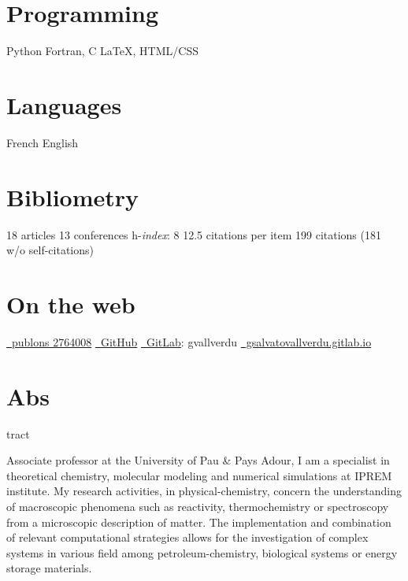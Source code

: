 \documentclass{cv-style}     %
\begin{document}
\begin{aside}
    \section{Programming}
    {\color{gray}\faPython} Python
    Fortran, C
    \LaTeX{}, HTML/CSS
    \section{Languages}
    French
    English 
    \section{Bibliometry}
    18 articles
    13 conferences
    h-\textit{index}: 8
    12.5 citations per item
    199 citations (181 w/o self-citations)
    \section{On the web}
    \href{https://publons.com/researcher/2764008/}{\color{gray}\faNewspaper\small ~publons 2764008}
    \href{https://github.com/gVallverdu}{\color{gray}\faGithub\small ~GitHub} \href{https://gitlab.com/gvallverdu}{\color{gray}\faGitlab\small ~GitLab}: {\small gvallverdu} 
    \href{https://gsalvatovallverdu.gitlab.io/}{\color{gray}\faFile*[regular]\small ~gsalvatovallverdu.gitlab.io}
\end{aside}

\vspace{0mm}
\section{Abs}{tract}
\vspace{-0.2cm}


Associate professor at the University of Pau \& Pays Adour, I am a specialist in
theoretical chemistry, molecular modeling and numerical simulations at IPREM institute.
My research activities, in physical-chemistry, concern the understanding 
of macroscopic phenomena such as reactivity, thermochemistry or spectroscopy from
a microscopic description of matter. The implementation and combination of relevant computational
strategies allows for the investigation of complex systems in various field among
petroleum-chemistry, biological systems or energy storage materials.
\end{document}
